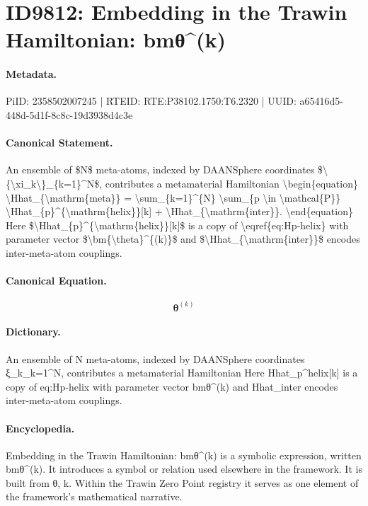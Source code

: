 \section*{ID9812: Embedding in the Trawin Hamiltonian: bmθ\textasciicircum{}(k)}
\paragraph{Metadata.}
PiID: 2358502007245 | RTEID: RTE:P38102.1750:T6.2320 | UUID: a65416d5-448d-5d1f-8c8c-19d3938d4c3e

\paragraph{Canonical Statement.}
An ensemble of \$N\$ meta-atoms, indexed by DAANSphere coordinates \$\textbackslash{}\{\textbackslash{}xi\_k\textbackslash{}\}\_\{k=1\}\textasciicircum{}N\$, contributes a metamaterial Hamiltonian \textbackslash{}begin\{equation\} \textbackslash{}Hhat\_\{\textbackslash{}mathrm\{meta\}\} = \textbackslash{}sum\_\{k=1\}\textasciicircum{}\{N\} \textbackslash{}sum\_\{p \textbackslash{}in \textbackslash{}mathcal\{P\}\} \textbackslash{}Hhat\_\{p\}\textasciicircum{}\{\textbackslash{}mathrm\{helix\}\}[k] + \textbackslash{}Hhat\_\{\textbackslash{}mathrm\{inter\}\}. \textbackslash{}end\{equation\} Here \$\textbackslash{}Hhat\_\{p\}\textasciicircum{}\{\textbackslash{}mathrm\{helix\}\}[k]\$ is a copy of \textbackslash{}eqref\{eq:Hp-helix\} with parameter vector \$\textbackslash{}bm\{\textbackslash{}theta\}\textasciicircum{}\{(k)\}\$ and \$\textbackslash{}Hhat\_\{\textbackslash{}mathrm\{inter\}\}\$ encodes inter-meta-atom couplings.

\paragraph{Canonical Equation.}
\[
\bm{\theta}^{(k)}
\]

\paragraph{Dictionary.}
An ensemble of N meta-atoms, indexed by DAANSphere coordinates ξ\_k\_k=1\textasciicircum{}N, contributes a metamaterial Hamiltonian Here Hhat\_p\textasciicircum{}helix[k] is a copy of eq:Hp-helix with parameter vector bmθ\textasciicircum{}(k) and Hhat\_inter encodes inter-meta-atom couplings.

\paragraph{Encyclopedia.}
Embedding in the Trawin Hamiltonian: bmθ\textasciicircum{}(k) is a symbolic expression, written bmθ\textasciicircum{}(k). It introduces a symbol or relation used elsewhere in the framework. It is built from θ, k. Within the Trawin Zero Point registry it serves as one element of the framework's mathematical narrative.
